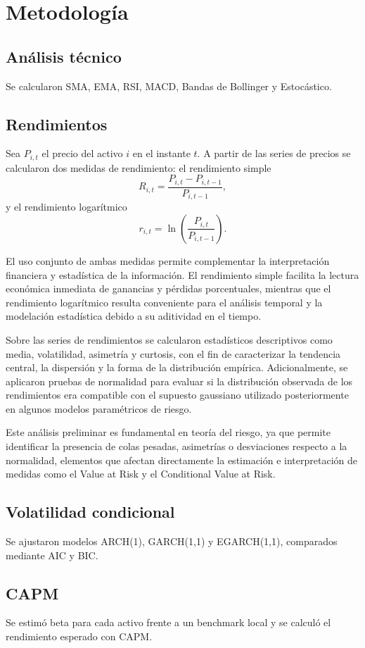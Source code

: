 \documentclass[11pt]{article}
\begin{document}
\section{Metodología}
\subsection{Análisis técnico}
Se calcularon SMA, EMA, RSI, MACD, Bandas de Bollinger y Estocástico.

\subsection{Rendimientos}
Sea \(P_{i,t}\) el precio del activo \(i\) en el instante \(t\). A partir de las series de precios se calcularon dos medidas de rendimiento: el rendimiento simple
\[
R_{i,t}=\frac{P_{i,t}-P_{i,t-1}}{P_{i,t-1}},
\]
y el rendimiento logarítmico
\[
r_{i,t}=\ln\left(\frac{P_{i,t}}{P_{i,t-1}}\right).
\]

El uso conjunto de ambas medidas permite complementar la interpretación financiera y estadística de la información. El rendimiento simple facilita la lectura económica inmediata de ganancias y pérdidas porcentuales, mientras que el rendimiento logarítmico resulta conveniente para el análisis temporal y la modelación estadística debido a su aditividad en el tiempo.

Sobre las series de rendimientos se calcularon estadísticos descriptivos como media, volatilidad, asimetría y curtosis, con el fin de caracterizar la tendencia central, la dispersión y la forma de la distribución empírica. Adicionalmente, se aplicaron pruebas de normalidad para evaluar si la distribución observada de los rendimientos era compatible con el supuesto gaussiano utilizado posteriormente en algunos modelos paramétricos de riesgo.

Este análisis preliminar es fundamental en teoría del riesgo, ya que permite identificar la presencia de colas pesadas, asimetrías o desviaciones respecto a la normalidad, elementos que afectan directamente la estimación e interpretación de medidas como el Value at Risk y el Conditional Value at Risk.

\subsection{Volatilidad condicional}
Se ajustaron modelos ARCH(1), GARCH(1,1) y EGARCH(1,1), comparados mediante AIC y BIC.

\subsection{CAPM}
Se estimó beta para cada activo frente a un benchmark local y se calculó el rendimiento esperado con CAPM.
\end{document}
